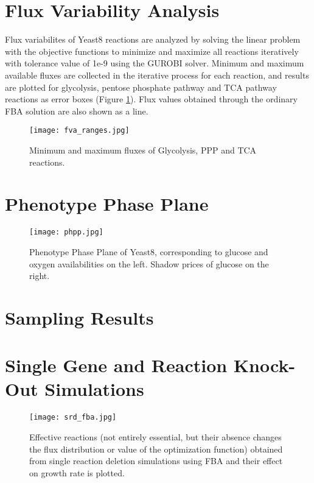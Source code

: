 \section{Flux Variability Analysis}
Flux variabilites of Yeast8 reactions are analyzed by solving the linear problem with the objective functions to minimize and maximize all reactions iteratively with tolerance value of 1e-9 using the GUROBI solver. Minimum and maximum available fluxes are collected in the iterative process for each reaction, and results are plotted for glycolysis, pentose phosphate pathway and TCA pathway reactions as error boxes (Figure \ref{fig:fva}). Flux values obtained through the ordinary FBA solution are also shown as a line.

\begin{figure}[H]
\begin{center}
\texttt{[image: fva\_ranges.jpg]}
\end{center}
\caption[Minimum and maximum fluxes of Glycolysis, PPP and TCA reactions]{Minimum and maximum fluxes of Glycolysis, PPP and TCA reactions.}
\label{fig:fva}
\end{figure}


\section{Phenotype Phase Plane}

\begin{figure}[H]
\begin{center}
\texttt{[image: phpp.jpg]}
\end{center}
\caption[Phenotype Phase Plane of Yeast8]{Phenotype Phase Plane of Yeast8, corresponding to glucose and oxygen availabilities on the left. Shadow prices of glucose on the right.}
\label{fig:phpp}
\end{figure}

\section{Sampling Results}




\section{Single Gene and Reaction Knock-Out Simulations}

\begin{figure}[H]
\begin{center}
\texttt{[image: srd\_fba.jpg]}
\end{center}
\caption[Effective reactions found from the deletion analysis using FBA]{Effective reactions (not entirely essential, but  their absence changes the flux distribution or value of the optimization function) obtained from single reaction deletion simulations using FBA and their effect on growth rate is plotted.}
\label{fig:srd_fba}
\end{figure}

